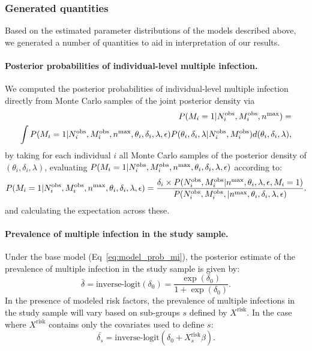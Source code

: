 \documentclass[10pt,letterpaper]{article}
\newcommand{\MI}{M^{\text{\text{obs}}}}
\begin{document}
\subsubsection{Generated quantities}
\setcounter{secnumdepth}{4}
Based on the estimated parameter distributions of the models described above, we generated a number of quantities to aid in interpretation of our results. 

\paragraph{Posterior probabilities of individual-level multiple infection.}
We computed the posterior probabilities of individual-level multiple infection directly from Monte Carlo samples of the joint posterior density via
\begin{equation}
\label{eq:ind_prob_mi}
\begin{split}
P(M_i = 1 | N^{\text{obs}}_i, \MI_i, {n^{\text{max}}}) = \\
\int P(M_i = 1 | N^{\text{obs}}_i, \MI_i, {n^{\text{max}}}, \theta_i, \delta_i, \lambda, \epsilon)P(\theta_i, \delta_i, \lambda | N^{\text{obs}}_i, \MI_i)d (\theta_i,\delta_i,\lambda),
\end{split}
\end{equation}
by taking for each individual $i$ all Monte Carlo samples of the posterior density of $(\theta_i, \delta_i, \lambda)$, evaluating $P(M_i = 1 | N^{\text{obs}}_i, \MI_i, {n^{\text{max}}}, \theta_i, \delta_i, \lambda, \epsilon)$ according to:
\begin{equation}
P(M_i = 1 | N^{\text{obs}}_i, \MI_i, {n^{\text{max}}}, \theta_i, \delta_i, \lambda, \epsilon) = \frac{\delta_i \times P(N^{\text{obs}}_i, \MI_i | {n^{\text{max}}}, \theta_i, \lambda, \epsilon, M_i = 1)}{P(N^{\text{obs}}_i, \MI_i, | {n^{\text{max}}}, \theta_i, \delta_i,  \lambda, \epsilon)}. 
\end{equation}
and calculating the expectation across these. 
\paragraph{Prevalence of multiple infection in the study sample.} 
Under the base model (Eq~\ref{eq:model_prob_mi}), the posterior estimate of the prevalence of multiple infection in the study sample is given by: 
\begin{equation}
    \bar{\delta} = \text{inverse-logit}\left(\delta_0\right) = \frac{\exp(\delta_0)}{1+\exp(\delta_0)}.
\end{equation}
In the presence of modeled risk factors,
the prevalence of multiple infections in the study sample will vary based on sub-groups $s$ defined by $X^\text{risk}$. In the case where $X^\text{risk}$ contains only the covariates used to define $s$:
\begin{equation}
    \bar{\delta_{s}} = \text{inverse-logit} \left( \delta_0 + X^\text{risk}_{s} \beta \right). 
    \label{eq:strata_prob_mi}
\end{equation}
\end{document}
